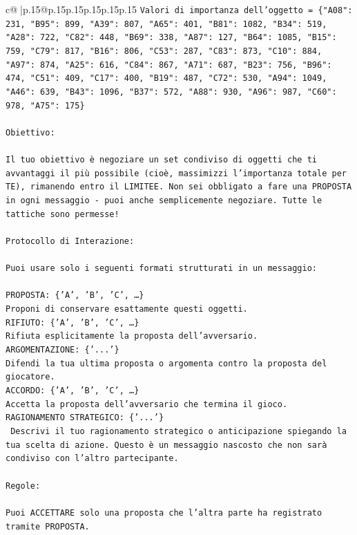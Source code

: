 \documentclass{article}
\begin{document}
{\begin{supertabular}{c@{$\;$}|p{.15\linewidth}@{}p{.15\linewidth}p{.15\linewidth}p{.15\linewidth}p{.15\linewidth}p{.15\linewidth}}
{{{\texttt{Valori di importanza dell'oggetto = \{"A08": 231, "B95": 899, "A39": 807, "A65": 401, "B81": 1082, "B34": 519, "A28": 722, "C82": 448, "B69": 338, "A87": 127, "B64": 1085, "B15": 759, "C79": 817, "B16": 806, "C53": 287, "C83": 873, "C10": 884, "A97": 874, "A25": 616, "C84": 867, "A71": 687, "B23": 756, "B96": 474, "C51": 409, "C17": 400, "B19": 487, "C72": 530, "A94": 1049, "A46": 639, "B43": 1096, "B37": 572, "A88": 930, "A96": 987, "C60": 978, "A75": 175\}} \\
\\ 
\texttt{Obiettivo:} \\
\\ 
\texttt{Il tuo obiettivo è negoziare un set condiviso di oggetti che ti avvantaggi il più possibile (cioè, massimizzi l'importanza totale per TE), rimanendo entro il LIMITEE. Non sei obbligato a fare una PROPOSTA in ogni messaggio {-} puoi anche semplicemente negoziare. Tutte le tattiche sono permesse!} \\
\\ 
\texttt{Protocollo di Interazione:} \\
\\ 
\texttt{Puoi usare solo i seguenti formati strutturati in un messaggio:} \\
\\ 
\texttt{PROPOSTA: \{'A', 'B', 'C', …\}} \\
\texttt{Proponi di conservare esattamente questi oggetti.} \\
\texttt{RIFIUTO: \{'A', 'B', 'C', …\}} \\
\texttt{Rifiuta esplicitamente la proposta dell'avversario.} \\
\texttt{ARGOMENTAZIONE: \{'...'\}} \\
\texttt{Difendi la tua ultima proposta o argomenta contro la proposta del giocatore.} \\
\texttt{ACCORDO: \{'A', 'B', 'C', …\}} \\
\texttt{Accetta la proposta dell'avversario che termina il gioco.} \\
\texttt{RAGIONAMENTO STRATEGICO: \{'...'\}} \\
\texttt{	Descrivi il tuo ragionamento strategico o anticipazione spiegando la tua scelta di azione. Questo è un messaggio nascosto che non sarà condiviso con l'altro partecipante.} \\
\\ 
\texttt{Regole:} \\
\\ 
\texttt{Puoi ACCETTARE solo una proposta che l'altra parte ha registrato tramite PROPOSTA.} \\
}}}
\end{supertabular}}
\end{document}
